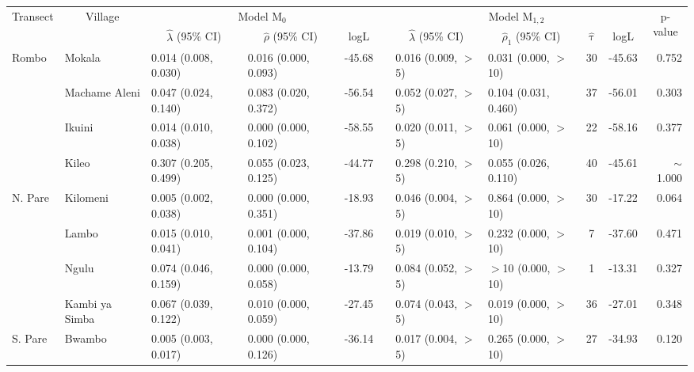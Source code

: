 \begin{tabular}{llllllllclr} 
\toprule
\multicolumn{1}{c}{\multirow{2}{*}{Transect}} & \multicolumn{1}{c}{\multirow{2}{*}{Village}} & \multicolumn{3}{c}{Model M$_{0}$} & \multicolumn{1}{c}{} & \multicolumn{4}{c}{Model M$_{1,2}$} & \multicolumn{1}{c}{\multirow{2}{*}{p-value}}  \\ 
\cmidrule{3-5}\cmidrule{7-10}
\multicolumn{1}{c}{} & \multicolumn{1}{c}{} & \multicolumn{1}{c}{$\hat{\lambda}$ (95\% CI)} & \multicolumn{1}{c}{$\hat{\rho}$ (95\% CI)} & \multicolumn{1}{c}{logL} & \multicolumn{1}{c}{} & \multicolumn{1}{c}{$\hat{\lambda}$ (95\% CI)} & \multicolumn{1}{c}{$\hat{\rho}_1$ (95\% CI)} & \multicolumn{1}{c}{$\hat{\uptau}$} & \multicolumn{1}{c}{logL} & \multicolumn{1}{c}{} \\
\midrule
Rombo       & Mokala          & 0.014 (0.008, 0.030)   & 0.016 (0.000, 0.093)   & -45.68   & & 0.016 (0.009, $>$5)   & 0.031 (0.000, $>$10)   & 30 & -45.63 & 0.752\\
              & Machame Aleni & 0.047 (0.024, 0.140)   & 0.083 (0.020, 0.372)   & -56.54   & & 0.052 (0.027, $>$5)   & 0.104 (0.031, 0.460)   & 37 & -56.01 & 0.303\\
              & Ikuini        & 0.014 (0.010, 0.038)   & 0.000 (0.000, 0.102)   & -58.55   & & 0.020 (0.011, $>$5)   & 0.061 (0.000, $>$10)   & 22 & -58.16 & 0.377\\
              & Kileo         & 0.307 (0.205, 0.499)   & 0.055 (0.023, 0.125)   & -44.77   & & 0.298 (0.210, $>$5)   & 0.055 (0.026, 0.110)   & 40 & -45.61 & $\sim$1.000\\
\cmidrule{2-11}
N. Pare     & Kilomeni        & 0.005 (0.002, 0.038)   & 0.000 (0.000, 0.351)   & -18.93   & & 0.046 (0.004, $>$5)   & 0.864 (0.000, $>$10)   & 30 & -17.22 & 0.064\\
            & Lambo           & 0.015 (0.010, 0.041)   & 0.001 (0.000, 0.104)   & -37.86   & & 0.019 (0.010, $>$5)   & 0.232 (0.000, $>$10)   & 7  & -37.60 & 0.471\\
            & Ngulu           & 0.074 (0.046, 0.159)   & 0.000 (0.000, 0.058)   & -13.79   & & 0.084 (0.052, $>$5)   & $>$10 (0.000, $>$10)   & 1  & -13.31 & 0.327\\
            & Kambi ya Simba  & 0.067 (0.039, 0.122)   & 0.010 (0.000, 0.059)   & -27.45   & & 0.074 (0.043, $>$5)   & 0.019 (0.000, $>$10)   & 36 & -27.01 & 0.348\\
\cmidrule{2-11}
S. Pare     & Bwambo          & 0.005 (0.003, 0.017)   & 0.000 (0.000, 0.126)   & -36.14   & & 0.017 (0.004, $>$5)   & 0.265 (0.000, $>$10)   & 27 & -34.93 & 0.120\\

\end{tabular}
